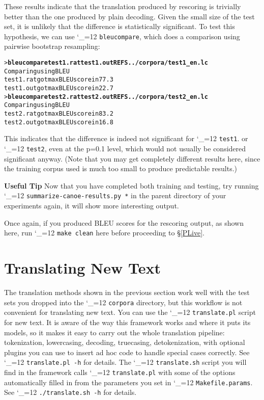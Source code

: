 \documentclass[11pt,letterpaper]{article}
\def\code{\begingroup\catcode`\_=12 \codex}
\newcommand{\codex}[1]{\texttt{#1}\endgroup}
\newcommand{\tip}{\textbf{Useful Tip \large{\ding{43}} }}
\newcommand{\margintip}{\marginpar[{\textbf{Tip \large{\ding{43}}}}]{\textbf{\reflectbox{\large{\ding{43}}} Tip}}}
\newcommand{\tipend}{\textbf{ \reflectbox{\large{\ding{43}}}}}
\begin{document}
These results indicate that the translation produced by rescoring is trivially better
than the one produced by plain decoding. Given the small size of the test set,
it is unlikely that the difference is statistically significant. To test
this hypothesis, we can use \code{bleucompare}, which does a comparison using
pairwise bootstrap resampling:
\begin{small}
\begin{alltt}
   > \textbf{bleucompare test1.rat test1.out REFS ../corpora/test1_en.lc}
   Comparing using BLEU
   test1.rat got max BLEU score in 77.3% of samples
   test1.out got max BLEU score in 22.7% of samples
   > \textbf{bleucompare test2.rat test2.out REFS ../corpora/test2_en.lc}
   Comparing using BLEU
   test2.rat got max BLEU score in 83.2% of samples
   test2.out got max BLEU score in 16.8% of samples
\end{alltt}
\end{small}
This indicates that the difference is indeed not significant for \code{test1}.
or \code{test2}, even at the p=0.1 level, which would not
usually be considered significant anyway.  (Note that you may get completely
different results here, since the training corpus used is much too small to
produce predictable results.)

\tip \margintip Now that you have completed both training and testing, try
running \code{summarize-canoe-results.py *} in the parent directory of your
experiments again, it will show more interesting output.\tipend

Once again, if you produced BLEU scores for the rescoring output, as shown
here, run \code{make clean} here before proceeding to \S\ref{PLive}.

\section{Translating New Text} \label{NewText}

The translation methods shown in the previous section work well with the test
sets you dropped into the \code{corpora} directory, but this workflow is not
convenient for translating new text.  You can use the \code{translate.pl} script
for new text. It is aware of the way this framework works and where it puts its
models, so it makes it easy to carry out the whole translation pipeline:
tokenization, lowercasing, decoding, truecasing, detokenization, with optional
plugins you can use to insert ad hoc code to handle special cases correctly. 
See \code{translate.pl -h} for details.  The \code{translate.sh} script you will
find in the framework calls \code{translate.pl} with some of the options
automatically filled in from the parameters you set in \code{Makefile.params}.
See \code{./translate.sh -h} for details.
\end{document}
